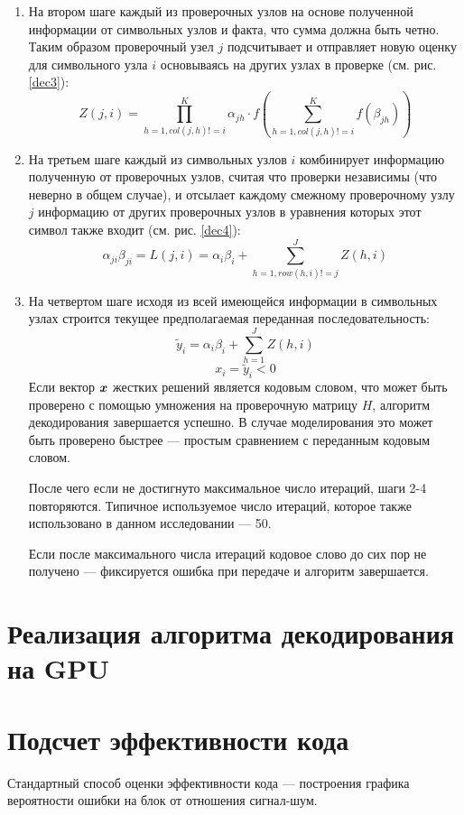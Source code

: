 \begin{enumerate}[label=\arabic*.]
\item На втором шаге каждый из проверочных узлов на основе полученной информации от символьных узлов и факта,
что сумма должна быть четно. Таким образом проверочный узел $j$ подсчитывает и отправляет новую оценку
 для символьного узла $i$ основываясь на других узлах в проверке (см. рис. \ref{dec3}):
\[
Z(j,i)=\prod_{h=1,col(j,h)!=i}^{K} \alpha_{jh} \cdot
		f(\sum_{h=1,col(j,h)!=i}^{K}f(\beta_{jh}))
\]

\item На третьем шаге каждый из символьных узлов $i$ комбинирует информацию полученную от проверочных узлов,
считая что проверки независимы (что неверно в общем случае), и отсылает каждому смежному проверочному узлу $j$ 
информацию от других проверочных узлов в уравнения которых этот символ также входит (см. рис. \ref{dec4}):
\[
\alpha_{ji} \beta_{ji} = L(j,i)=\alpha_i \beta_i + \sum_{h=1,row(h,i)!=j}^J Z(h,i)
\]

\item На четвертом шаге исходя из всей имеющейся информации в символьных узлах строится текущее предполагаемая
переданная последовательность:
\[
	\widetilde{y}_i = \alpha_i \beta_i + \sum_{h=1}^J Z(h,i)
\]
\[
	x_i = \widetilde{y}_i < 0
\]
Если вектор $\boldsymbol{x}$ жестких решений является кодовым словом, что может быть проверено с помощью умножения
 на проверочную матрицу
$H$, алгоритм декодирования завершается успешно. В случае моделирования это может быть проверено быстрее ---
простым сравнением с переданным кодовым словом.

После чего если не достигнуто максимальное число итераций, шаги 2-4 повторяются.
 Типичное используемое число итераций, которое также использовано в данном исследовании --- 50.

Если после максимального числа итераций кодовое слово до сих пор не получено --- фиксируется ошибка при
передаче и алгоритм завершается.
\end{enumerate}
\section{Реализация алгоритма декодирования на GPU}

\section{Подсчет эффективности кода}

Стандартный способ оценки эффективности кода --- построения
графика вероятности ошибки на блок от отношения сигнал-шум.

